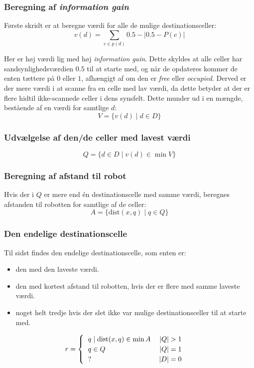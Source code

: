 \subsubsection{Beregning af \textit{information gain}}
Første skridt er at beregne værdi for alle de mulige destinationsceller:
\begin{equation}
v(d) = \sum_{c \in p(d)} 0.5-|0.5 - P(c)|
\end{equation}

Her er høj værdi lig med høj \textit{information gain}.
Dette skyldes at alle celler har sandsynlighedsværdien $0.5$ til at starte med, og når de opdateres kommer de enten tættere på $0$ eller $1$, afhængigt af om den er \textit{free} eller \textit{occupied}.
Derved er der mere værdi i at scanne fra en celle med lav værdi, da dette betyder at der er flere hidtil ikke-scannede celler i dens synsfelt.
Dette munder ud i en mængde, bestående af en værdi for samtlige $d$:
\begin{equation}
V = \{ v(d) \mid d \in D \}
\end{equation}

\subsubsection{Udvælgelse af den/de celler med lavest værdi}
\begin{equation}
Q = \{ d \in D \mid v(d) \in \min V \}
\end{equation}

\subsubsection{Beregning af afstand til robot}
Hvis der i $Q$ er mere end én destinationscelle med samme værdi, beregnes afstanden til robotten for samtlige af de celler:
\begin{equation}
A = \{ \text{dist}(x,q) \mid q \in Q \}
\end{equation}

\subsubsection{Den endelige destinationscelle}
Til sidst findes den endelige destinationscelle, som enten er:
\begin{itemize}
\item{den med den laveste værdi.}
\item{den med kortest afstand til robotten, hvis der er flere med samme laveste værdi.}
\item{noget helt tredje hvis der slet ikke var mulige destinationsceller til at starte med.}
\end{itemize}
\begin{equation}
r = \begin{cases}
\begin{tabular}{lr}
$q \mid \text{dist}(x,q) \in \min A$ & $|Q| > 1$\\
$q \in Q$ & $|Q| = 1$ \\
$?$ & $|D| = 0$
\end{tabular}
\end{cases}
\end{equation}

